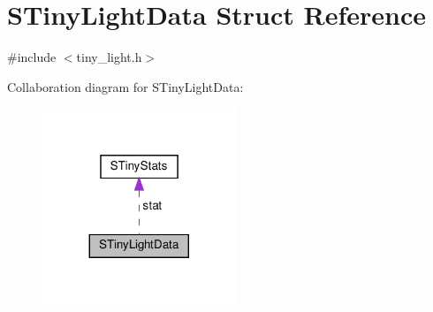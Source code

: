 \hypertarget{structSTinyLightData}{}\section{S\+Tiny\+Light\+Data Struct Reference}
\label{structSTinyLightData}


{\ttfamily \#include $<$tiny\+\_\+light.\+h$>$}



Collaboration diagram for S\+Tiny\+Light\+Data\+:
\nopagebreak
\begin{figure}[H]
\begin{center}
\leavevmode
\includegraphics[width=164pt]{structSTinyLightData__coll__graph}
\end{center}
\end{figure}
